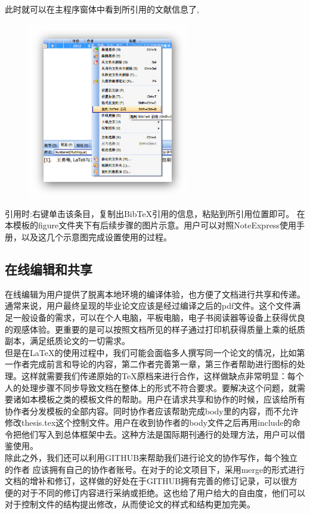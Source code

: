 此时就可以在主程序窗体中看到所引用的文献信息了,
\begin{figure}[htbp]
\centering
\includegraphics[width=7cm]{figure/7}
\end{figure}
引用时:右键单击该条目，复制出Bib\TeX 引用的信息，粘贴到所引用位置即可。
在本模板的figure文件夹下有后续步骤的图片示意。用户可以对照NoteExpress使用手册，以及这几个示意图完成设置使用的过程。

\subsection{在线编辑和共享}
在线编辑为用户提供了脱离本地环境的编译体验，也方便了文档进行共享和传递。通常来说，用户最终呈现的毕业论文应该是经过编译之后的pdf文件。这个文件满足一般设备的需求，可以在个人电脑，平板电脑，电子书阅读器等设备上获得优良的观感体验。更重要的是可以按照文档所见的样子通过打印机获得质量上乘的纸质副本，满足纸质论文的一切需求。\\

但是在\LaTeX 的使用过程中，我们可能会面临多人撰写同一个论文的情况，比如第一作者完成前言和导论的内容，第二作者完善第一章，第三作者帮助进行图标的处理。这样就需要我们传递原始的\TeX 原档来进行合作，这样做缺点非常明显：每个人的处理步骤不同步导致文档在整体上的形式不符合要求。要解决这个问题，就需要诸如本模板之类的模板文件的帮助。用户在请求共享和协作的时候，应该给所有协作者分发模板的全部内容。同时协作者应该帮助完成body里的内容，而不允许修改thesis.tex这个控制文件。用户在收到协作者的body文件之后再用include的命令把他们写入到总体框架中去。这种方法是国际期刊通行的处理方法，用户可以借鉴使用。\\

除此之外，我们还可以利用GITHUB来帮助我们进行论文的协作写作，每个独立的作者
应该拥有自己的协作者账号。在对于的论文项目下，采用merge的形式进行文档的增补和修订，这样做的好处在于GITHUB拥有完善的修订记录，可以很方便的对于不同的修订内容进行采纳或拒绝。这也给了用户给大的自由度，他们可以对于控制文件的结构提出修改，从而使论文的样式和结构更加完美。